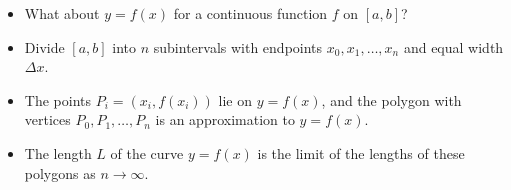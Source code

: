 \begin{frame}
\begin{itemize}
\item  What about $y = f(x)$ for a continuous function $f$ on $[a, b]$?
\item<2->  Divide $[a,b]$ into $n$ subintervals with endpoints $x_0, x_1, \ldots , x_n$ and equal width $\Delta x$.
\item<3->  The points $P_i = (x_i, f(x_i))$ lie on $y = f(x)$, and the polygon with vertices $P_0, P_1, \ldots , P_n$ is an approximation to $y = f(x)$.
\item<4->  The length $L$ of the curve $y = f(x)$ is the limit of the lengths of these polygons as $n\rightarrow \infty$.
\end{itemize}
\begin{columns}[c]
\begin{center}
\ %
%
\end{center}
\end{columns}
\end{frame}
